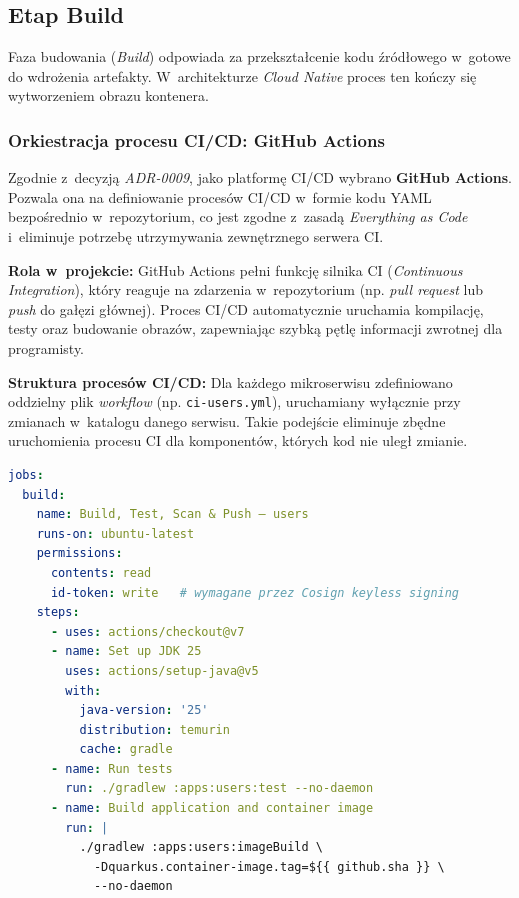 \subsection{Etap Build}
Faza budowania (\textit{Build}) odpowiada za przekształcenie kodu źródłowego w~gotowe do wdrożenia artefakty. W~architekturze \textit{Cloud Native} proces ten kończy się wytworzeniem obrazu kontenera.

\subsubsection{Orkiestracja procesu CI/CD: GitHub Actions}
Zgodnie z~decyzją \textit{ADR-0009}, jako platformę CI/CD wybrano \textbf{GitHub Actions}. Pozwala ona na definiowanie procesów CI/CD w~formie kodu YAML bezpośrednio w~repozytorium, co jest zgodne z~zasadą \textit{Everything as Code} i~eliminuje potrzebę utrzymywania zewnętrznego serwera CI.

\textbf{Rola w~projekcie:}
GitHub Actions pełni funkcję silnika CI (\textit{Continuous Integration}), który reaguje na zdarzenia w~repozytorium (np. \textit{pull request} lub \textit{push} do gałęzi głównej). Proces CI/CD automatycznie uruchamia kompilację, testy oraz budowanie obrazów, zapewniając szybką pętlę informacji zwrotnej dla programisty.

\textbf{Struktura procesów CI/CD:}
Dla każdego mikroserwisu zdefiniowano oddzielny plik \textit{workflow} (np. \texttt{ci-users.yml}), uruchamiany wyłącznie przy zmianach w~katalogu danego serwisu. Takie podejście eliminuje zbędne uruchomienia procesu CI dla komponentów, których kod nie uległ zmianie.

\begin{lstlisting}[language=yaml, caption={Fragment procesu CI --- budowanie i~push obrazu natywnego (.github/workflows/ci-users.yml)}, label={lst:github-actions-build}]
jobs:
  build:
    name: Build, Test, Scan & Push — users
    runs-on: ubuntu-latest
    permissions:
      contents: read
      id-token: write   # wymagane przez Cosign keyless signing
    steps:
      - uses: actions/checkout@v7
      - name: Set up JDK 25
        uses: actions/setup-java@v5
        with:
          java-version: '25'
          distribution: temurin
          cache: gradle
      - name: Run tests
        run: ./gradlew :apps:users:test --no-daemon
      - name: Build application and container image
        run: |
          ./gradlew :apps:users:imageBuild \
            -Dquarkus.container-image.tag=${{ github.sha }} \
            --no-daemon
\end{lstlisting}

